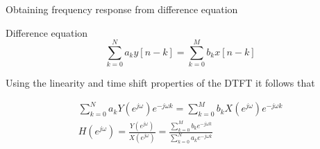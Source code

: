%
\begin{frame}{Obtaining frequency response from difference equation}
	
	\begin{block}{Difference equation}
		\begin{equation*}
		\sum_{k=0}^N a_k y[n-k] = \sum_{k=0}^Mb_k x[n-k]
		\end{equation*}
	\end{block}
	
	Using the linearity and time shift properties of the DTFT it follows that
	
	\begin{align*}
	\sum_{k=0}^N a_kY(e^{j\omega})e^{-j\omega k} = \sum_{k=0}^M b_kX(e^{j\omega})e^{-j\omega k} \\
	H(e^{j\omega}) = \frac{Y(e^{j\omega})}{X(e^{j\omega})} = \frac{\sum_{k=0}^M b_ke^{-j\omega k}}{\sum_{k=0}^N a_ke^{-j\omega k}}
	\end{align*}
\end{frame}



